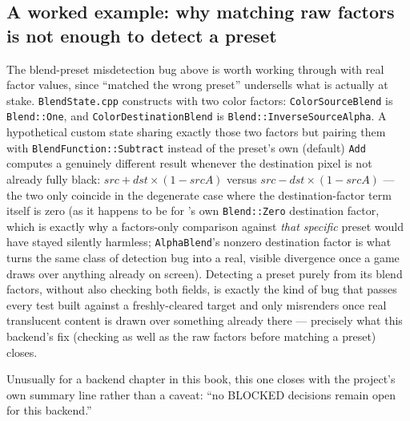 \subsection{A worked example: why matching raw factors is not enough to detect a preset}

The blend-preset misdetection bug above is worth working through with real factor values,
since ``matched the wrong preset'' undersells what is actually at stake.
\texttt{BlendState.cpp} constructs  with two color factors:
\texttt{ColorSourceBlend} is \texttt{Blend::One}, and \texttt{ColorDestinationBlend} is
\texttt{Blend::InverseSourceAlpha}. A hypothetical custom state sharing exactly those two
factors but pairing them with
\texttt{BlendFunction::Subtract} instead of the preset's own (default) \texttt{Add} computes a
genuinely different result whenever the destination pixel is not already fully black:
$\mathit{src} + \mathit{dst} \times (1 - \mathit{srcA})$ versus
$\mathit{src} - \mathit{dst} \times (1 - \mathit{srcA})$ --- the two only coincide in the
degenerate case where the destination-factor term itself is zero (as it happens to be for
's own \texttt{Blend::Zero} destination factor, which is exactly
why a factors-only comparison against \emph{that specific} preset would have stayed silently
harmless; \texttt{AlphaBlend}'s nonzero destination factor is what turns the same class of
detection bug into a real, visible divergence once a game draws over anything already on
screen). Detecting a preset purely from its blend factors, without also checking both
 fields, is exactly the kind of bug that passes every test built
against a freshly-cleared target and only misrenders once real translucent content is drawn
over something already there --- precisely what this backend's fix (checking
 as well as the raw factors before matching a preset) closes.

Unusually for a backend chapter in this book, this one closes with the project's own summary
line rather than a caveat: ``no BLOCKED decisions remain open for this backend.''
